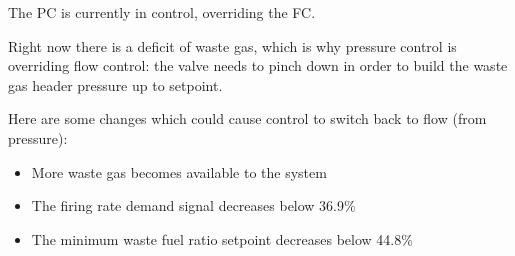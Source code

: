 The PC is currently in control, overriding the FC.







Right now there is a deficit of waste gas, which is why pressure control is overriding flow control: the valve needs to pinch down in order to build the waste gas header pressure up to setpoint.

\vskip 10pt

Here are some changes which could cause control to switch back to flow (from pressure):

\begin{itemize}
\item{} More waste gas becomes available to the system
\item{} The firing rate demand signal decreases below 36.9\%
\item{} The minimum waste fuel ratio setpoint decreases below 44.8\%
\end{itemize}




